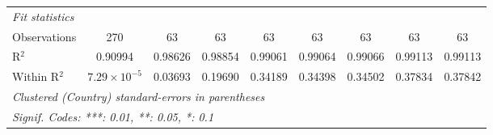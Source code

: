 \begin{table}[htbp]
\begin{tabular}{lcccccccc}
      \midrule
      \emph{Fit statistics}\\
      Observations                                                                    & 270                   & 63       & 63              & 63              & 63              & 63              & 63              & 63\\  
      R$^2$                                                                           & 0.90994               & 0.98626  & 0.98854         & 0.99061         & 0.99064         & 0.99066         & 0.99113         & 0.99113\\  
      Within R$^2$                                                                    & $7.29\times 10^{-5}$  & 0.03693  & 0.19690         & 0.34189         & 0.34398         & 0.34502         & 0.37834         & 0.37842\\  
      \midrule \midrule
      \multicolumn{9}{l}{\emph{Clustered (Country) standard-errors in parentheses}}\\
      \multicolumn{9}{l}{\emph{Signif. Codes: ***: 0.01, **: 0.05, *: 0.1}}\\
   \end{tabular}
\end{table}


